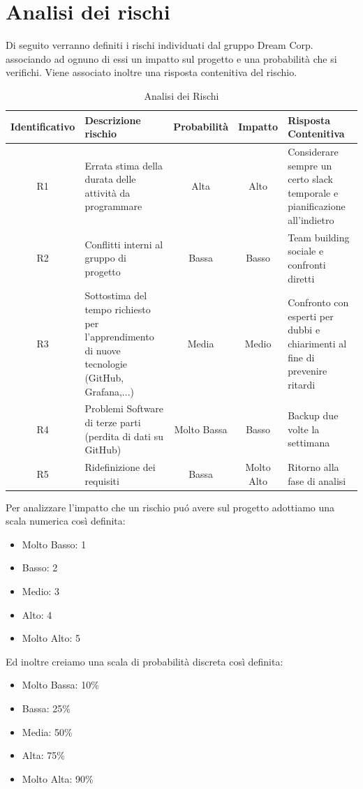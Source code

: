 \section{Analisi dei rischi}

	Di seguito verranno definiti i rischi individuati dal gruppo Dream Corp. associando ad ognuno di essi un impatto sul progetto e una probabilità che si verifichi. Viene associato inoltre una risposta contenitiva del rischio. 
	\begin{table}[!htpb]
		\centering
		\renewcommand{\arraystretch}{2} 
		\begin{tabular}{|c|p{3.6cm}|c|c|p{3.6cm}|}
			\rowcolor{orange!50}
			\hline
			\textbf{Identificativo} & \textbf{Descrizione rischio} & \textbf{Probabilità} & \textbf{Impatto} & \textbf{Risposta Contenitiva}\\
			\hline
			R1 & Errata stima della durata delle attività da programmare & Alta & Alto & Considerare sempre un certo slack temporale e pianificazione all’indietro\\
			\hline
			R2 & Conflitti interni al gruppo di progetto & Bassa & Basso & Team building sociale e confronti diretti\\
			\hline
			R3 & Sottostima del tempo richiesto per l’apprendimento di nuove tecnologie (GitHub, Grafana,...) & Media & Medio & Confronto con esperti per dubbi e chiarimenti al fine di prevenire ritardi\\
			\hline
			R4 & Problemi Software di terze parti (perdita di dati su GitHub) & Molto  Bassa & Basso &  Backup due volte la settimana\\
			\hline
			R5 & Ridefinizione dei requisiti & Bassa & Molto Alto & Ritorno alla fase di analisi\\
			\hline
		\end{tabular}
		\caption{Analisi dei Rischi}
	\end{table}
	\clearpage
	Per analizzare l'impatto che un rischio puó avere sul progetto adottiamo una scala numerica così definita:
	\begin{itemize}
		\item Molto Basso: 1
		\item Basso: 2
		\item Medio: 3
		\item Alto: 4
		\item Molto Alto: 5
	\end{itemize}
	Ed inoltre creiamo una scala di probabilità discreta così definita:
	\begin{itemize}
		\item Molto Bassa: 10\%
		\item Bassa: 25\%
		\item Media: 50\%
		\item Alta: 75\%
		\item Molto Alta: 90\%
	\end{itemize}
